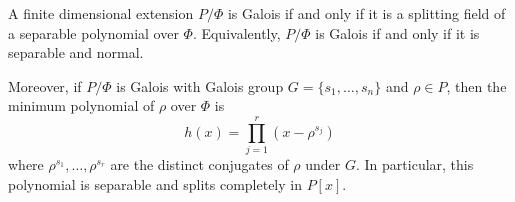 A finite dimensional extension $P/\Phi$ is Galois if and only if it is a splitting field of a separable polynomial over $\Phi$. Equivalently, $P/\Phi$ is Galois if and only if it is separable and normal.

Moreover, if $P/\Phi$ is Galois with Galois group $G = \{s_1, \dots, s_n\}$ and $\rho \in P$, then the minimum polynomial of $\rho$ over $\Phi$ is
$$h(x) = \prod_{j=1}^{r} (x - \rho^{s_j})$$
where $\rho^{s_1}, \dots, \rho^{s_r}$ are the distinct conjugates of $\rho$ under $G$. In particular, this polynomial is separable and splits completely in $P[x]$.
